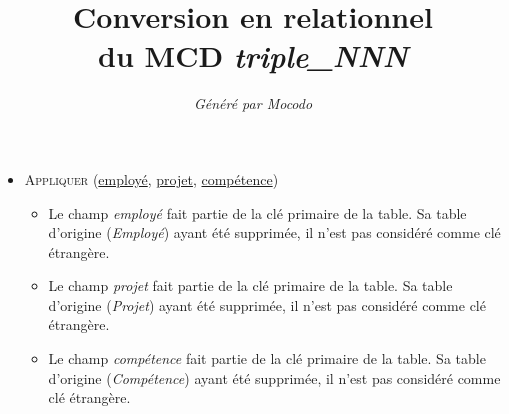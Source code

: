 \documentclass[a4paper]{article}
\title{Conversion en relationnel\\du MCD \emph{triple_NNN}}
\author{\emph{Généré par Mocodo}}
\newcommand{\relat}[1]{\textsc{#1}}
\newcommand{\prim}[1]{\uline{#1}}
\begin{document}
\maketitle

\begin{itemize}
  \item \relat{Appliquer} (\prim{employé}, \prim{projet}, \prim{compétence})
  \begin{itemize}
    \item Le champ \emph{employé} fait partie de la clé primaire de la table. Sa table d'origine (\emph{Employé}) ayant été supprimée, il n'est pas considéré comme clé étrangère.
    \item Le champ \emph{projet} fait partie de la clé primaire de la table. Sa table d'origine (\emph{Projet}) ayant été supprimée, il n'est pas considéré comme clé étrangère.
    \item Le champ \emph{compétence} fait partie de la clé primaire de la table. Sa table d'origine (\emph{Compétence}) ayant été supprimée, il n'est pas considéré comme clé étrangère.
  \end{itemize}

\end{itemize}
\end{document}
